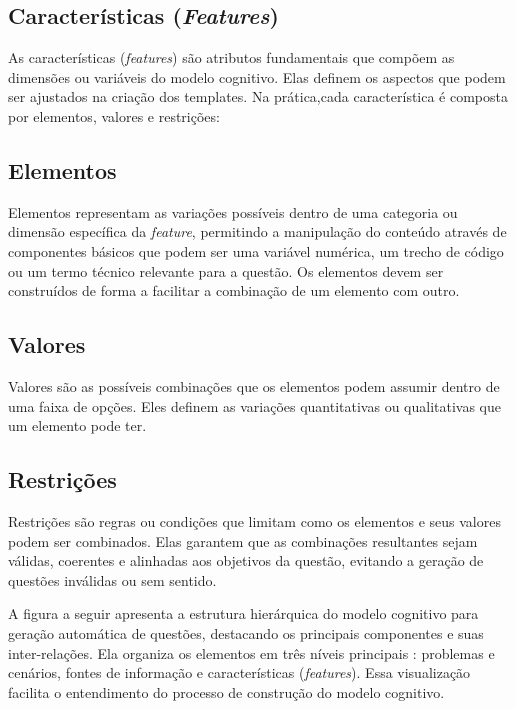 \subsection{Características (\textit{Features})}

As características (\textit{features}) são atributos fundamentais que compõem as dimensões ou variáveis do modelo cognitivo. Elas definem os aspectos que podem ser ajustados na criação dos templates. Na prática,cada característica é composta por elementos, valores e restrições:


\subsection{Elementos}
Elementos representam as variações possíveis dentro de uma categoria ou dimensão específica da \textit{feature}, permitindo a manipulação do conteúdo através de componentes básicos que podem ser uma variável numérica, um trecho de código ou um termo técnico relevante para a questão. Os elementos devem ser construídos de forma a facilitar a combinação de um elemento com outro.

\subsection{Valores}
Valores são as possíveis combinações que os elementos podem assumir dentro de uma faixa de opções. Eles definem as variações quantitativas ou qualitativas que um elemento pode ter.

\subsection{Restrições}
Restrições são regras ou condições que limitam como os elementos e seus valores podem ser combinados. Elas garantem que as combinações resultantes sejam válidas, coerentes e alinhadas aos objetivos da questão, evitando a geração de questões inválidas ou sem sentido.

A figura a seguir apresenta a estrutura hierárquica do modelo cognitivo para geração automática de questões, destacando os principais componentes e suas inter-relações. Ela organiza os elementos em três níveis principais : problemas e cenários, fontes de informação e características (\textit{features}). Essa visualização facilita o entendimento do processo de construção do modelo cognitivo.


